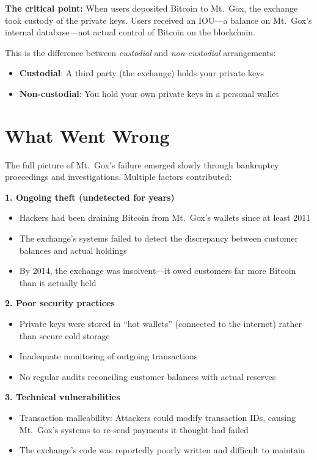 \documentclass[11pt]{article}
\begin{document}
\medskip
\noindent\textbf{The critical point:} When users deposited Bitcoin to Mt.\ Gox, the exchange took custody of the private keys. Users received an IOU---a balance on Mt.\ Gox's internal database---not actual control of Bitcoin on the blockchain.

This is the difference between \textit{custodial} and \textit{non-custodial} arrangements:
\begin{itemize}[leftmargin=*]
\item \textbf{Custodial}: A third party (the exchange) holds your private keys
\item \textbf{Non-custodial}: You hold your own private keys in a personal wallet
\end{itemize}

\section*{What Went Wrong}

The full picture of Mt.\ Gox's failure emerged slowly through bankruptcy proceedings and investigations. Multiple factors contributed:

\medskip
\noindent\textbf{1. Ongoing theft (undetected for years)}
\begin{itemize}[leftmargin=*]
\item Hackers had been draining Bitcoin from Mt.\ Gox's wallets since at least 2011
\item The exchange's systems failed to detect the discrepancy between customer balances and actual holdings
\item By 2014, the exchange was insolvent---it owed customers far more Bitcoin than it actually held
\end{itemize}

\medskip
\noindent\textbf{2. Poor security practices}
\begin{itemize}[leftmargin=*]
\item Private keys were stored in ``hot wallets'' (connected to the internet) rather than secure cold storage
\item Inadequate monitoring of outgoing transactions
\item No regular audits reconciling customer balances with actual reserves
\end{itemize}

\medskip
\noindent\textbf{3. Technical vulnerabilities}
\begin{itemize}[leftmargin=*]
\item Transaction malleability: Attackers could modify transaction IDs, causing Mt.\ Gox's systems to re-send payments it thought had failed
\item The exchange's code was reportedly poorly written and difficult to maintain
\end{itemize}
\end{document}
